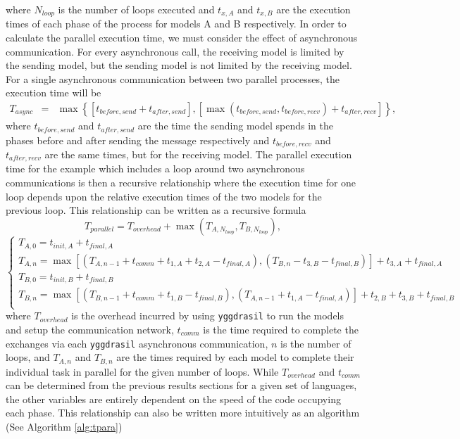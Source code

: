 \documentclass[journal]{IEEEtran}
\newcommand{\pkg}{{\tt yggdrasil}{}}
\begin{document}
%
where $N_{loop}$ is the number of loops executed and $t_{x,A}$ and $t_{x,B}$ are the execution times of each phase of the process for models A and B respectively.
%
In order to calculate the parallel execution time, we must consider the effect of asynchronous communication. For every asynchronous call, the receiving model is limited by the sending model, but the sending model is not limited by the receiving model. For a single asynchronous communication between two parallel processes, the execution time will be
%
\begin{eqnarray}
T_{async} & = & \max\left\{\left[t_{before,send} + t_{after,send}\right], \left[\max(t_{before,send}, t_{before,recv}) + t_{after,recv}\right]\right\},
\end{eqnarray}
%
where $t_{before,send}$ and $t_{after,send}$ are the time the sending model spends in the phases before and after sending the message respectively and $t_{before,recv}$ and $t_{after,recv}$ are the same times, but for the receiving model. The parallel execution time for the example which includes a loop around two asynchronous communications is then a recursive relationship where the execution time for one loop depends upon the relative execution times of the two models for the previous loop. This relationship can be written as a recursive formula
%
\begin{equation}
T_{parallel} = T_{overhead} + \max(T_{A,N_{loop}}, T_{B,N_{loop}}),
\end{equation}
\begin{equation}
\begin{cases}
T_{A, 0} = t_{init,A} + t_{final,A} \\
T_{A, n} = \max\left[(T_{A, n-1} + t_{comm} + t_{1,A} + t_{2,A} - t_{final,A}), (T_{B, n} - t_{3,B} - t_{final,B})\right] + t_{3,A} + t_{final,A}\\
T_{B, 0} = t_{init,B} + t_{final,B}\\
T_{B, n} = \max\left[(T_{B, n-1} + t_{comm} + t_{1,B} - t_{final,B}), (T_{A, n-1} + t_{1,A} - t_{final,A})\right] + t_{2,B} + t_{3,B} + t_{final,B}\\
\end{cases}
\end{equation}
%
where $T_{overhead}$ is the overhead incurred by using {\pkg} to run the models and setup the communication network, $t_{comm}$ is the time required to complete the exchanges via each {\pkg} asynchronous communication, $n$ is the number of loops, and $T_{A,n}$ and $T_{B,n}$ are the times required by each model to complete their individual task in parallel for the given number of loops. While $T_{overhead}$ and $t_{comm}$ can be determined from the previous results sections for a given set of languages, the other variables are entirely dependent on the speed of the code occupying each phase. This relationship can also be written more intuitively as an algorithm (See Algorithm \ref{alg:tpara}) 
\end{document}

